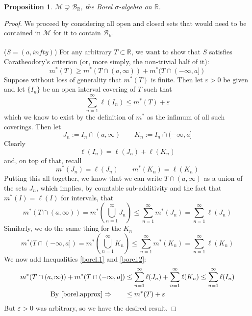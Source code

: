 \documentclass[12pt]{article}
\theoremstyle{plain}
\newtheorem{prop}[thm]{Proposition}
\theoremstyle{definition}
\theoremstyle{remark}
\begin{document}
\begin{prop} $\mathscr{M}\supsetneq \mathscr{B}_\mathbb{R}$, the Borel $\sigma$-algebra on $\mathbb{R}$. 
\end{prop}
\begin{proof} We proceed by considering all open and closed sets that would need to be contained in $\mathscr{M}$ for it to contain $\mathscr{B}_\mathbb{R}$.
\\
\\
($S=(a,infty)$) For any arbitrary $T\subset\mathbb{R}$, we want to show that $S$ satisfies Caratheodory's criterion (or, more simply, the non-trivial half of it):
\begin{equation}
    \label{borel.cara}
    m^*(T) \geq m^*(T \cap (a,\infty)) + 
    m^*(T \cap (-\infty,a])
\end{equation}
Suppose without loss of generality that $m^*(T)$ is finite. Then let $\varepsilon>0$ be given and let $\{I_n\}$ be an open interval covering of $T$ such that
\begin{equation}
    \label{borel.approx}
    \sum^\infty_{n=1} \ell(I_n) \leq m^*(T) + \varepsilon
\end{equation}
which we know to exist by the definition of $m^*$ as the infimum of all such coverings. Then let 
\[
    J_n := I_n \cap (a,\infty)
    \qquad
    K_n := I_n \cap (-\infty,a]
\]
Clearly
\[
    \ell(I_n) = \ell(J_n) + \ell(K_n)
\]
and, on top of that, recall 
\[
    m^*(J_n) = \ell(J_n) 
    \qquad
    m^*(K_n) = \ell(K_n) 
\]
Putting this all together, we know that we can write $T\cap (a,\infty)$ as a union of the sets $J_n$, which implies, by countable sub-additivity and the fact that $m^*(I) = \ell(I)$ for intervals, that
\begin{equation}
    \label{borel.1}
    m^*(T \cap (a,\infty)) =
    m^*\left(\bigcup^\infty_{n=1} J_n\right) 
    \leq \sum^\infty_{n=1}
    m^*(J_n) = \sum^\infty_{n=1} \ell(J_n)
\end{equation}
Similarly, we do the same thing for the $K_n$
\begin{equation}
    \label{borel.2}
    m^*(T \cap (-\infty,a]) =
    m^*\left(\bigcup^\infty_{n=1} K_n\right) 
    \leq \sum^\infty_{n=1}
    m^*(K_n) = \sum^\infty_{n=1} \ell(K_n)
\end{equation}
We now add Inequalities \ref{borel.1} and \ref{borel.2}:
\begin{align*}
    m^*(T \cap (a,\infty)) +
    m^*(T \cap (-\infty,a]) &\leq
    \sum^\infty_{n=1} \ell(J_n)
    + \sum^\infty_{n=1} \ell(K_n) 
    \leq \sum^\infty_{n=1} \ell(I_n) \\
    \text{By \ref{borel.approx}} \Rightarrow
    \qquad &\leq m^*(T) + \varepsilon
\end{align*}
But $\varepsilon>0$ was arbitrary, so we have the desired result.
\end{proof}
\end{document}
